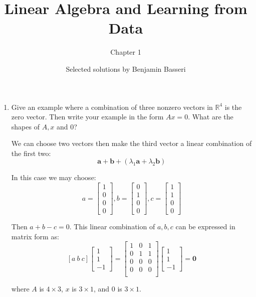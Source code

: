 \documentclass{scrartcl}
\newcommand{\R}{\mathbb{R}}
\begin{document}
\title{Linear Algebra and Learning from Data}
\subtitle{Chapter 1}
\author{Selected solutions by Benjamin Basseri}
\date{}
\maketitle

\begin{enumerate}
	\item Give an example where a combination of three nonzero vectors in $\R^4$ is the zero vector. Then write your example in the form $Ax = 0$. What are the shapes of $A, x$ and 0?

We can choose two vectors then make the third vector a linear combination of the first two:
$$\mathbf{a} + \mathbf{b} + (\lambda_1 \mathbf{a} + \lambda_2 \mathbf{b})$$

In this case we may choose:
$$a = \begin{bmatrix}
	1 \\ 0 \\ 0 \\ 0
\end{bmatrix}, 
b = \begin{bmatrix}
	0 \\ 1 \\ 0 \\ 0
\end{bmatrix},
c = \begin{bmatrix}
	1 \\ 1\\ 0 \\ 0
\end{bmatrix}$$

Then $a + b - c = 0$. This linear combination of $a, b, c$ can be expressed in matrix form as:
$$[a \ b \ c] \begin{bmatrix}
	1 \\ 1 \\ -1
\end{bmatrix} = 
\begin{bmatrix}
	1 & 0 & 1 \\
	0 & 1 & 1 \\
	0 & 0 & 0 \\ 
	0 & 0 & 0 \\
\end{bmatrix}
\begin{bmatrix}
	1 \\ 1 \\ -1
\end{bmatrix} = \mathbf{0}$$

where $A$ is $4 \times 3$, $x$ is $3 \times 1$, and 0 is $3\times 1$.


\end{enumerate}
\end{document}

